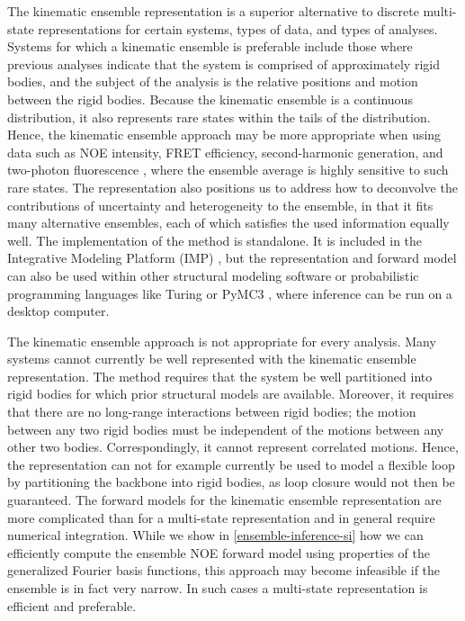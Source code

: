 \documentclass[../../main.tex]{subfiles}
\begin{document}
\begin{refsection}
	The kinematic ensemble representation is a superior alternative to discrete multi-state representations for certain systems, types of data, and types of analyses.
	Systems for which a kinematic ensemble is preferable include those where previous analyses indicate that the system is comprised of approximately rigid bodies, and the subject of the analysis is the relative positions and motion between the rigid bodies.
	Because the kinematic ensemble is a continuous distribution, it also represents rare states within the tails of the distribution.
	Hence, the kinematic ensemble approach may be more appropriate when using data such as NOE intensity, FRET efficiency, second-harmonic generation, and two-photon fluorescence \supercite{clancyAngularMappingProtein2019}, where the ensemble average is highly sensitive to such rare states.
	The representation also positions us to address how to deconvolve the contributions of uncertainty and heterogeneity to the ensemble, in that it fits many alternative ensembles, each of which satisfies the used information equally well.
	The implementation of the method is standalone.
	It is included in the Integrative Modeling Platform (IMP) \supercite{russelPuttingPiecesTogether2012}, but the representation and forward model can also be used within other structural modeling software or probabilistic programming languages like Turing \supercite{geTuringLanguageFlexible2018} or PyMC3 \supercite{salvatierProbabilisticProgrammingPython2016}, where inference can be run on a desktop computer.


	The kinematic ensemble approach is not appropriate for every analysis.
	Many systems cannot currently be well represented with the kinematic ensemble representation.
	The method requires that the system be well partitioned into rigid bodies for which prior structural models are available.
	Moreover, it requires that there are no long-range interactions between rigid bodies; the motion between any two rigid bodies must be independent of the motions between any other two bodies.
	Correspondingly, it cannot represent correlated motions.
	Hence, the representation can not for example currently be used to model a flexible loop by partitioning the backbone into rigid bodies, as loop closure would not then be guaranteed.
	The forward models for the kinematic ensemble representation are more complicated than for a multi-state representation and in general require numerical integration.
	While we show in \cref{ensemble-inference-si} how we can efficiently compute the ensemble NOE forward model using properties of the generalized Fourier basis functions, this approach may become infeasible if the ensemble is in fact very narrow.
	In such cases a multi-state representation is efficient and preferable.


\end{refsection}
\end{document}
